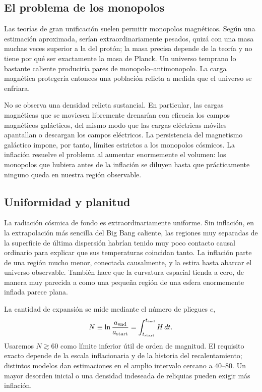 \subsection{El problema de los monopolos}

Las teorías de gran unificación suelen permitir monopolos magnéticos. Según una estimación aproximada, serían extraordinariamente pesados, quizá con una masa muchas veces superior a la del protón; la masa precisa depende de la teoría y no tiene por qué ser exactamente la masa de Planck. Un universo temprano lo bastante caliente produciría pares de monopolo--antimonopolo. La carga magnética protegería entonces una población relicta a medida que el universo se enfriara.

No se observa una densidad relicta sustancial. En particular, las cargas magnéticas que se moviesen libremente drenarían con eficacia los campos magnéticos galácticos, del mismo modo que las cargas eléctricas móviles apantallan o descargan los campos eléctricos. La persistencia del magnetismo galáctico impone, por tanto, límites estrictos a los monopolos cósmicos. La inflación resuelve el problema al aumentar enormemente el volumen: los monopolos que hubiera antes de la inflación se diluyen hasta que prácticamente ninguno queda en nuestra región observable.

\subsection{Uniformidad y planitud}

La radiación cósmica de fondo es extraordinariamente uniforme. Sin inflación, en la extrapolación más sencilla del Big Bang caliente, las regiones muy separadas de la superficie de última dispersión habrían tenido muy poco contacto causal ordinario para explicar que sus temperaturas coincidan tanto. La inflación parte de una región mucho menor, conectada causalmente, y la estira hasta abarcar el universo observable. También hace que la curvatura espacial tienda a cero, de manera muy parecida a como una pequeña región de una esfera enormemente inflada parece plana.

La cantidad de expansión se mide mediante el número de pliegues \(e\),
\begin{equation}
N\equiv \ln\frac{a_{\rm end}}{a_{\rm start}}
=\int_{t_{\rm start}}^{t_{\rm end}}H\,dt.
\label{eq:c09-efolds}
\end{equation}
Usaremos \(N\gtrsim60\) como límite inferior útil de orden de magnitud. El requisito exacto depende de la escala inflacionaria y de la historia del recalentamiento; distintos modelos dan estimaciones en el amplio intervalo cercano a \(40\)--\(80\). Un mayor desorden inicial o una densidad indeseada de reliquias pueden exigir más inflación.

